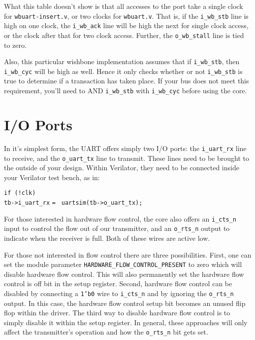 \documentclass{gqtekspec}
\begin{document}
What this table doesn't show is that all accesses to the port take a single
clock for {\tt wbuart-insert.v}, or two clocks for {\tt wbuart.v}.  That is, if
the {\tt i\_wb\_stb} line is high on one clock, the {\tt i\_wb\_ack} line will
be high the next for single clock access, or the clock after that for two
clock access.  Further, the {\tt o\_wb\_stall} line is tied to zero. 

Also, this particular wishbone implementation assumes that if {\tt i\_wb\_stb},
then {\tt i\_wb\_cyc} will be high as well.  Hence it only checks whether or not
{\tt i\_wb\_stb} is true to determine if a transaction has taken place.  If your
bus does not meet this requirement, you'll need to AND {\tt i\_wb\_stb} with
{\tt i\_wb\_cyc} before using the core.

\chapter{I/O Ports}\label{ch:ioports}

In it's simplest form, the UART offers simply two I/O ports: the
{\tt i\_uart\_rx} line to receive, and the {\tt o\_uart\_tx} line to transmit.
These lines need to be brought to the outside of your design.  Within
Verilator, they need to be connected inside your Verilator test bench, as in:
\begin{tabbing}
{\tt if (!clk)} \= \\
\> {\tt tb->i\_uart\_rx} {\tt = } {\tt uartsim(tb->o\_uart\_tx);}
\end{tabbing}

For those interested in hardware flow control, the core also offers an
{\tt i\_cts\_n} input to control the flow out of our transmitter, and an
{\tt o\_rts\_n} output to indicate when the receiver is full.  Both of these
wires are active low. 

For those not interested in flow control there are three
possibilities.  First, one can set the module parameter
{\tt HARDWARE\_FLOW\_CONTROL\_PRESENT} to zero which will disable hardware
flow control.  This will also permanently set the hardware flow control is off
bit in the setup register.  Second, hardware flow control can be disabled by
connecting a {\tt 1'b0} wire to {\tt i\_cts\_n} and by ignoring the
{\tt o\_rts\_n} output.  In this case, the hardware flow control setup bit
becomes an unused flip flop within the driver. The third way to disable
hardware flow control is to simply disable it within the setup register.  In
general, these approaches will only affect the transmitter's operation and how
the {\tt o\_rts\_n} bit gets set.
\end{document}
